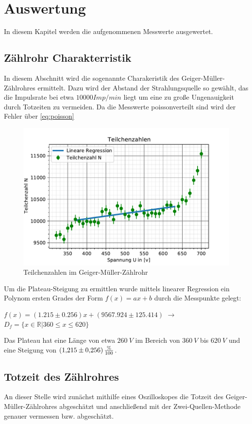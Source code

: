 \section{Auswertung}
\label{sec:auswertung}
In diesem Kapitel werden die aufgenommenen Messwerte ausgewertet.
\subsection{Zählrohr Charakterristik}
\label{sec:characteristik}
In diesem Abschnitt wird die sogenannte Charakeristik des Geiger-Müller-Zählrohres ermittelt. Dazu wird der
Abstand der Strahlungsquelle so gewählt, das die Impulsrate bei etwa $10000 Imp/min$ liegt um eine zu große 
Ungenauigkeit durch Totzeiten zu vermeiden. Da die Messwerte poissonverteilt sind wird der Fehler über \autoref{eq:poisson}
\begin{figure}
    \centering
    \includegraphics{kennlinie.pdf}
    \caption{Teilchenzahlen im Geiger-Müller-Zählrohr}
    \label{fig:teilchenzahl}
  \end{figure}
Um die Plateau-Steigung zu ermittlen wurde mittels linearer Regression ein Polynom ersten Grades der 
Form $f(x)=ax+b$ durch die Messpunkte gelegt:
\begin{center}
    $f(x)=(1.215\pm0.256)x + (9567.924\pm125.414)$ $\rightarrow$ $D_f=\{x\in\mathbb{R} \vert 360\le x\le620\}$    
\end{center}
Das Plateau hat eine Länge von etwa $\SI{260}{V}$ im Bereich von $\SI{360}{V}$ bis $\SI{620}{V}$ und  eine 
Steigung von $\SI{1,215\pm0,256}{\frac{\%}{100}}$.
\subsection{Totzeit des Zählrohres}
\label{sec:totzeit}
An dieser Stelle wird zunächst mithilfe eines Oszilloskopes die Totzeit des Geiger-Müller-Zählrohres
abgeschätzt und anschließend mit der Zwei-Quellen-Methode genauer vermessen bzw. abgeschätzt. 
